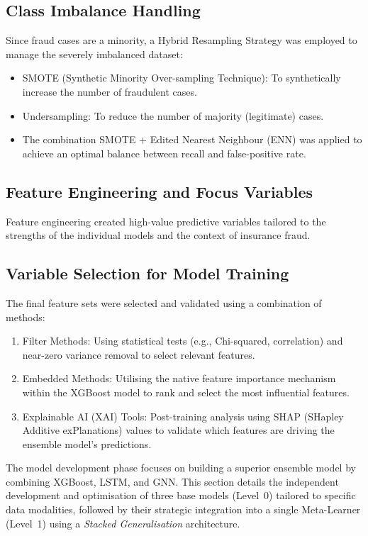 \documentclass[12pt,a4paper,oneside]{report}
\numberwithin{equation}{chapter}
\begin{document}
\subsection{Class Imbalance Handling}

Since fraud cases are a minority, a Hybrid Resampling Strategy was employed to manage the
severely imbalanced dataset:
\begin{itemize}
    \item SMOTE (Synthetic Minority Over-sampling Technique): To synthetically increase the number of fraudulent cases.
    \item Undersampling: To reduce the number of majority (legitimate) cases.
    \item The combination SMOTE + Edited Nearest Neighbour (ENN) was applied to achieve an optimal balance between recall and false-positive rate.
\end{itemize}

\subsection{Feature Engineering and Focus Variables}

Feature engineering created high-value predictive variables tailored to the strengths of the
individual models and the context of insurance fraud.

\subsection{Variable Selection for Model Training}

The final feature sets were selected and validated using a combination of methods:
\begin{enumerate}
    \item Filter Methods: Using statistical tests (e.g., Chi-squared, correlation) and near-zero variance removal to select relevant features.
    \item Embedded Methods: Utilising the native feature importance mechanism within the XGBoost model to rank and select the most influential features.
    \item Explainable AI (XAI) Tools: Post-training analysis using SHAP (SHapley Additive exPlanations) values to validate which features are driving the ensemble model's predictions.
\end{enumerate}

The model development phase focuses on building a superior ensemble model by combining XGBoost,
LSTM, and GNN. This section details the independent development and optimisation of three base
models (Level~0) tailored to specific data modalities, followed by their strategic integration
into a single Meta-Learner (Level~1) using a \textit{Stacked Generalisation} architecture.
\end{document}
